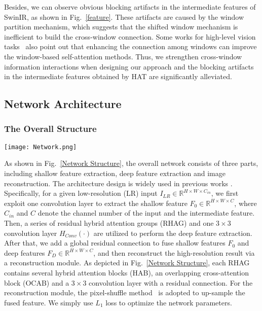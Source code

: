 \documentclass[10pt,twocolumn,letterpaper]{article}
\begin{document}
Besides, we can observe obvious blocking artifacts in the intermediate features of SwinIR, as shown in Fig.~\ref{feature}. These artifacts are caused by the window partition mechanism, which suggests that the shifted window mechanism is inefficient to build the cross-window connection.
Some works for high-level vision tasks~\cite{cswin,shufflet,palet,moa} also point out that enhancing the connection among windows can improve the window-based self-attention methods.
Thus, we strengthen cross-window information interactions when designing our approach and the blocking artifacts in the intermediate features obtained by HAT are significantly alleviated. 



\subsection{Network Architecture}

\subsubsection{The Overall Structure}

\begin{figure*}[!t]
\centering
\texttt{[image: Network.png]}
\vspace{-0.1cm}
\caption{The overall architecture of HAT and the structure of RHAG and HAB.}
\label{Network Structure}
\vspace{-0.5cm}
\end{figure*}


As shown in Fig.~\ref{Network Structure}, the overall network consists of three parts, including shallow feature extraction, deep feature extraction and image reconstruction. The architecture design is widely used in previous works \cite{rcan,swinir}. Specifically, for a given low-resolution (LR) input $I_{LR}\in\mathbb{R}^{H\times W\times C_{in}}$, we first exploit one convolution layer to extract the shallow feature $F_0\in\mathbb{R}^{H\times W\times C}$, where $C_{in}$ and $C$ denote the channel number of the input and the intermediate feature. Then, a series of residual hybrid attention groups (RHAG) and one $3\times 3$ convolution layer $H_{Conv}(\cdot)$ are utilized to perform the deep feature extraction. After that, we add a global residual connection to fuse shallow features $F_0$ and deep features $F_D\in\mathbb{R}^{H\times W\times C}$, and then reconstruct the high-resolution result via a reconstruction module. As depicted in Fig.~\ref{Network Structure}, each RHAG contains several hybrid attention blocks (HAB), an overlapping cross-attention block (OCAB) and a $3\times 3$ convolution layer with a residual connection. For the reconstruction module, the pixel-shuffle method~\cite{pixelshuffle} is adopted to up-sample the fused feature. We simply use $L_1$ loss to optimize the network parameters.
\end{document}
